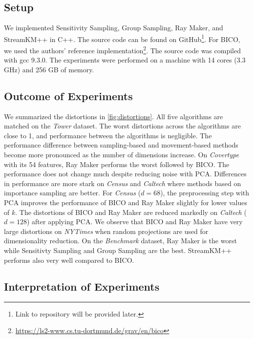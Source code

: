 \subsection{Setup}
We implemented Sensitivity Sampling, Group Sampling, Ray Maker, and StreamKM++ in C++. The source code can be found on GitHub\footnote{Link to repository will be provided later.}. For BICO, we used the authors' reference implementation\footnote{\url{https://ls2-www.cs.tu-dortmund.de/grav/en/bico}}. The source code was compiled with gcc 9.3.0. The experiments were performed on a machine with 14 cores (3.3 GHz) and 256 GB of memory.



\subsection{Outcome of Experiments}
We summarized the distortions in \cref{fig:distortions}.
All five algorithms are matched on the \textit{Tower} dataset. The worst distortions across the algorithms are close to 1, and performance between the algorithms is negligible. The performance difference between sampling-based and movement-based methods become more pronounced as the number of dimensions increase. On \textit{Covertype} with its 54 features, Ray Maker performs the worst followed by BICO. The performance does not change much despite reducing noise with PCA. Differences in performance are more stark on \textit{Census} and \textit{Caltech} where methods based on importance sampling are better. For \textit{Census} ($d=68$), the preprocessing step with PCA improves the performance of BICO and Ray Maker slightly for lower values of $k$. The distortions of BICO and Ray Maker are reduced markedly on \textit{Caltech} ($d=128$) after applying PCA. We observe that BICO and Ray Maker have very large distortions on \textit{NYTimes} when random projections are used for dimensionality reduction. On the \textit{Benchmark} dataset, Ray Maker is the worst while Sensitivty Sampling and Group Sampling are the best. StreamKM++ performs also very well compared to BICO.


\subsection{Interpretation of Experiments}

